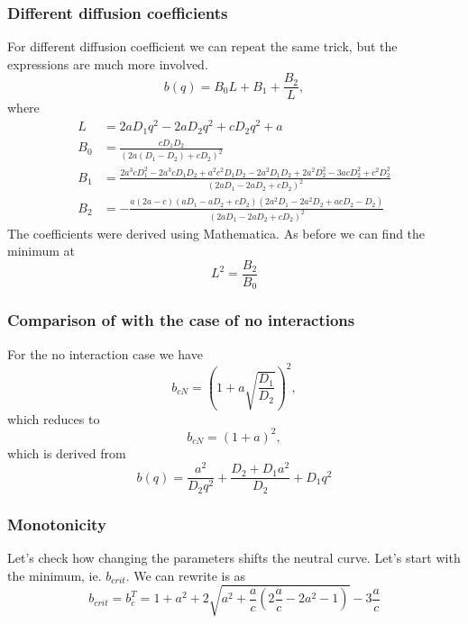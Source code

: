 \documentclass{article}
\begin{document}
\subsubsection{Different diffusion coefficients}
For different diffusion coefficient we can repeat the same trick, but the expressions are much more involved.
\begin{equation}
b(q) = B_0 L + B_1  + \frac{B_2}{L},
\end{equation} where
\begin{align}
L&=2 a D_1 q^2-2 a D_2 q^2+c D_2 q^2+a\\
B_0&=\frac{c D_1 D_2}{(2 a (D_1-D_2)+c D_2)^2}\\
B_1&=\frac{2 a^3 c D_1^2-2 a^3 c D_1 D_2+a^2 c^2 D_1 D_2-2 a^2 D_1 D_2+2 a^2 D_2^2-3 a c D_2^2+c^2 D_2^2}{(2 a D_1-2 a D_2+c D_2)^2}\\
B_2&=-\frac{a (2 a-c) (a D_1-a D_2+c D_2) \left(2 a^2 D_1-2 a^2 D_2+a c D_2-D_2\right)}{(2 a D_1-2 a D_2+c D_2)^2}
\end{align}
The coefficients were derived using Mathematica.
As before we can find the minimum at 
\begin{equation}
L^2 = \frac{B_2}{B_0}
\end{equation}
\subsubsection{Comparison of with the case of no interactions}
For the no interaction case we have
\begin{equation}
b_{cN} = (1+a\sqrt{\frac{D_1}{D_2}})^2,
\end{equation} which reduces to
\begin{equation}
b_{cN} = (1+a)^2,
\end{equation} which is derived from
\begin{equation}
b(q) = \frac{a^2}{D_2 q^2}+ \frac{D_2 + D_1 a^2}{D_2}+ D_1 q^2
\end{equation}
\subsubsection{Monotonicity}
Let's check how changing the parameters shifts the neutral curve.
Let's start with the minimum, ie. $b_{crit}$.
We can rewrite is as 
\begin{equation}
b_{crit} = b_c^T = 1+a^2 + 2\sqrt{a^2+\frac{a}{c}(2\frac{a}{c}-2a^2-1)}-3\frac{a}{c}
\end{equation}
\end{document}
